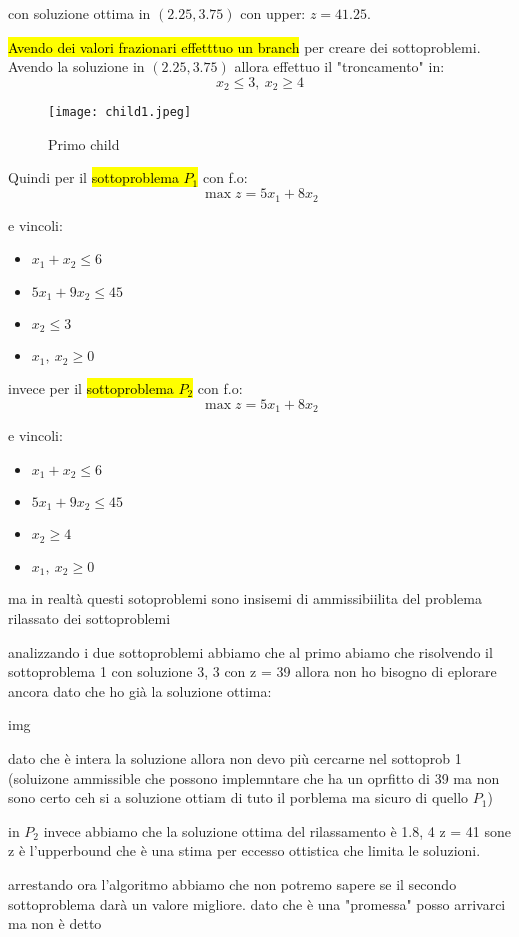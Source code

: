 con soluzione ottima in $(2.25, 3.75)$ con upper: $z = 41.25$.

\hl{Avendo dei valori frazionari effetttuo un branch} per creare dei sottoproblemi. Avendo la soluzione in $(2.25, 3.75)$ allora effettuo il "troncamento" in:
$$x_2 \leq 3,\ x_2 \geq 4$$

\begin{figure}[H]
\centering
\texttt{[image: child1.jpeg]}
\caption{Primo child} 
\label{child1}
\end{figure}

Quindi per il \hl{sottoproblema $P_1$} con f.o:
$$\max z = 5x_1 + 8x_2$$

e vincoli:
\begin{itemize}
    \item $x_1 + x_2 \leq 6$
    \item $5x_1 + 9x_2 \leq 45$
    \item $x_2 \leq 3$
    \item $x_1,\ x_2 \geq 0$
\end{itemize}

invece per il \hl{sottoproblema $P_2$} con f.o:
$$\max z = 5x_1 + 8x_2$$

e vincoli:
\begin{itemize}
    \item $x_1 + x_2 \leq 6$
    \item $5x_1 + 9x_2 \leq 45$
    \item $x_2 \geq 4$
    \item $x_1,\ x_2 \geq 0$
\end{itemize}


ma in realtà questi sotoproblemi sono insisemi di ammissibiilita del problema rilassato dei sottoproblemi


analizzando i due sottoproblemi abbiamo che al primo abiamo che risolvendo il sottoproblema 1 con soluzione 3, 3 con z = 39 allora non ho bisogno di eplorare ancora dato che ho già la soluzione ottima:

img

dato che è intera la soluzione allora non devo più cercarne nel sottoprob 1 (soluizone ammissible che possono implemntare che ha un oprfitto di 39 ma non sono certo ceh si a soluzione ottiam di tuto il porblema ma sicuro di quello $P_1$)


in $P_2$ invece abbiamo che la soluzione ottima del rilassamento è 1.8, 4 z = 41 sone z è l'upperbound che è una stima per eccesso ottistica che limita le soluzioni.

arrestando ora l'algoritmo abbiamo che non potremo sapere se il secondo sottoproblema darà un valore migliore. dato che è una "promessa" posso arrivarci ma non è detto

